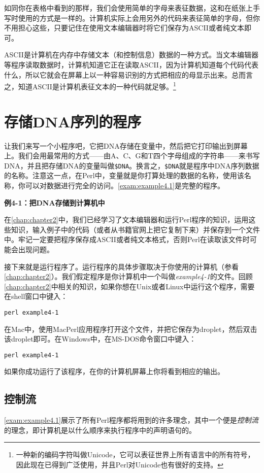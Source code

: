 如同你在表格中看到的那样，我们会使用简单的字母来表征数据，这和在纸张上手写时使用的方式是一样的。计算机实际上会用另外的代码来表征简单的字母，但你不用担心这些，只要记住在使用文本编辑器时将它们保存为ASCII或者纯文本即可。

ASCII是计算机在内存中存储文本（和控制信息）数据的一种方式。当文本编辑器等程序读取数据时，计算机知道它正在读取ASCII，因为计算机知道每个代码代表什么，所以它就会在屏幕上以一种容易识别的方式把相应的母显示出来。总而言之，知道ASCII是计算机表征文本的一种代码就足够。\footnote{一种新的编码字符叫做Unicode，它可以表征世界上所有语言中的所有符号，因此现在已得到广泛使用，并且Perl对Unicode也有很好的支持。}

\section{存储DNA序列的程序}
让我们来写一个小程序吧，它把DNA存储在变量中，然后把它打印输出到屏幕上。我们会用最常用的方式——由A、C、G和T四个字母组成的字符串——来书写DNA，并且把存储DNA的变量叫做\verb|$DNA|。换言之，\verb|$DNA|就是程序中DNA序列数据的名称。注意这一点，在Perl中，变量就是你打算处理的数据的名称，使用该名称，你可以对数据进行完全的访问。\autoref{exam:example4.1}是完整的程序。

\textbf{例4-1：把DNA存储到计算机中}


在\autoref{chap:chapter2}中，我们已经学习了文本编辑器和运行Perl程序的知识，运用这些知识，输入例子中的代码（或者从书籍官网上把它复制下来）并保存到一个文件中。牢记一定要把程序保存成ASCII或者纯文本格式，否则Perl在读取该文件时可能会出现问题。

接下来就是运行程序了。运行程序的具体步骤取决于你使用的计算机（参看\autoref{chap:chapter2}）。我们假定程序是你计算机中一个叫做\textit{example4-1}的文件。回顾\autoref{chap:chapter2}中相关的知识，如果你想在Unix或者Linux中运行这个程序，需要在shell窗口中键入：

\verb|perl example4-1 |

在Mac中，使用MacPerl应用程序打开这个文件，并把它保存为droplet，然后双击该droplet即可。在Windows中，在MS-DOS命令窗口中键入：

\verb|perl example4-1|

如果你成功运行了该程序，在你的计算机屏幕上你将看到相应的输出。

\subsection{控制流}
\autoref{exam:example4.1}展示了所有Perl程序都将用到的许多理念，其中一个便是\textit{控制流}的理念，即计算机是以什么顺序来执行程序中的声明语句的。

